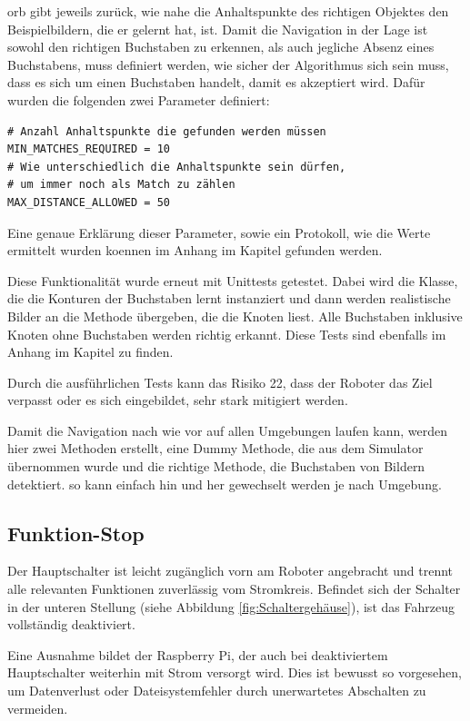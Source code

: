 \acrshort{orb} gibt jeweils zurück, wie nahe die Anhaltspunkte des richtigen Objektes den Beispielbildern, die er gelernt hat, ist. Damit die Navigation in der Lage ist sowohl den richtigen Buchstaben zu erkennen, als auch jegliche Absenz eines Buchstabens, muss definiert werden, wie sicher der Algorithmus sich sein muss, dass es sich um einen Buchstaben handelt, damit es akzeptiert wird. Dafür wurden die folgenden zwei Parameter definiert:
\begin{verbatim}
# Anzahl Anhaltspunkte die gefunden werden müssen
MIN_MATCHES_REQUIRED = 10
# Wie unterschiedlich die Anhaltspunkte sein dürfen,
# um immer noch als Match zu zählen
MAX_DISTANCE_ALLOWED = 50
\end{verbatim}

Eine genaue Erklärung dieser Parameter, sowie ein Protokoll, wie die Werte ermittelt wurden koennen im Anhang im Kapitel  gefunden werden.

Diese Funktionalität wurde erneut mit Unittests getestet.
Dabei wird die Klasse, die die Konturen der Buchstaben lernt instanziert und dann werden realistische Bilder an die Methode übergeben, die die Knoten liest. Alle Buchstaben inklusive Knoten ohne Buchstaben werden richtig erkannt. Diese Tests sind ebenfalls im Anhang im Kapitel  zu finden.

Durch die ausführlichen Tests kann das Risiko 22, dass der Roboter das Ziel verpasst oder es sich eingebildet, sehr stark mitigiert werden.

Damit die Navigation nach wie vor auf allen Umgebungen laufen kann, werden hier zwei Methoden erstellt, eine Dummy Methode, die aus dem Simulator übernommen wurde und die richtige Methode, die Buchstaben von Bildern detektiert. so kann einfach hin und her gewechselt werden je nach Umgebung.


\newpage
\subsection{Funktion-Stop}


Der Hauptschalter ist leicht zugänglich vorn am Roboter angebracht und trennt alle  relevanten Funktionen zuverlässig vom Stromkreis. Befindet sich der Schalter in der unteren Stellung (siehe Abbildung \ref{fig:Schaltergehäuse}), ist das Fahrzeug vollständig deaktiviert.

Eine Ausnahme bildet der Raspberry Pi, der auch bei deaktiviertem Hauptschalter weiterhin mit Strom versorgt wird. Dies ist bewusst so vorgesehen, um Datenverlust oder Dateisystemfehler durch unerwartetes Abschalten zu vermeiden.

